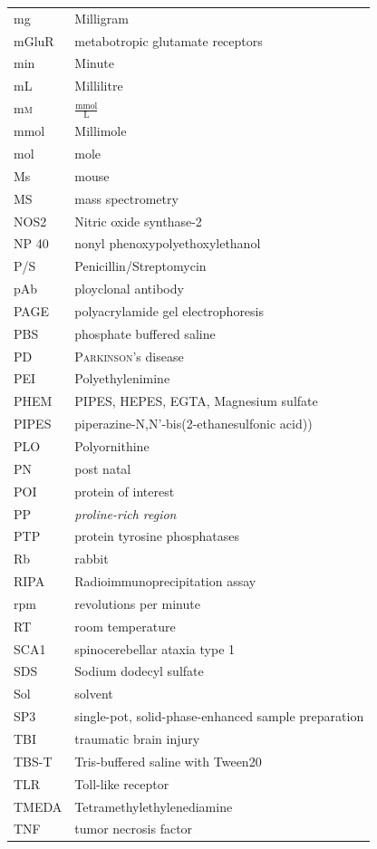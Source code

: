 \documentclass[a4paper,11pt,bibtotocnumbered]{article}
\begin{document}
\begin{small}
\begin{longtabu}{p{3cm}X}
mg & Milligram\\
mGluR&  metabotropic glutamate receptors\\
min & Minute\\
mL & Millilitre\\
m\textsc{m} & $\frac{\mathrm{mmol}}{\mathrm{L}}$\\
mmol & Millimole\\
mol&mole\\
Ms & mouse\\
MS& mass spectrometry\\
NOS2&Nitric oxide synthase-2\\
NP 40& nonyl phenoxypolyethoxylethanol\\
P/S & Penicillin/Streptomycin \\
pAb & ployclonal antibody\\
PAGE& polyacrylamide gel electrophoresis\\
PBS & phosphate buffered saline\\
PD&\textsc{Parkinson}'s disease\\
PEI&Polyethylenimine\\
PHEM & PIPES, HEPES, EGTA, Magnesium sulfate\\
PIPES&piperazine-N,N'-bis(2-ethanesulfonic acid))\\
PLO&Polyornithine\\
PN&post natal\\
POI&protein of interest\\
PP & \textit{proline-rich region}\\
PTP& protein tyrosine phosphatases\\
Rb & rabbit\\
RIPA & Radioimmunoprecipitation assay\\
rpm & revolutions per minute\\
RT& room temperature\\
SCA1&spinocerebellar ataxia type 1\\
SDS & Sodium dodecyl sulfate\\
Sol& solvent\\
SP3& single-pot, solid-phase-enhanced sample preparation \\
TBI&traumatic brain injury\\
TBS-T&Tris-buffered saline with Tween20\\
TLR&Toll-like receptor\\
TMEDA & Tetramethylethylenediamine\\
TNF&tumor necrosis factor\\

\end{longtabu}
\end{small}
\end{document}
